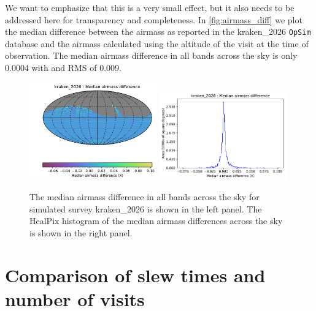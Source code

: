 \documentclass[DM,lsstdraft,authoryear,toc]{lsstdoc}
\newcommand{\opsim}{\texttt{OpSim}\xspace}
\begin{document}
We want to emphasize that this is a very small effect, but it also needs to be addressed here for transparency and
completeness.  In \autoref{fig:airmass_diff} we plot the median difference between the airmass as reported in the kraken\_2026
\opsim database and the airmass calculated using the altitude of the visit at the time of observation. The median airmass
difference in all bands across the sky is only 0.0004 with and RMS of 0.009.

\begin{figure}[ht]
\centering
\includegraphics[width=0.49\textwidth]{figures/kraken_2026_Median_airmass_difference_HEAL_SkyMap.pdf}
\includegraphics[width=0.49\textwidth]{figures/kraken_2026_Median_airmass_difference_HEAL_Histogram.pdf}
\caption{The median airmass difference  in all bands across the sky for simulated survey
kraken\_2026 is shown in the left panel. The HealPix histogram of the median airmass differences
across the sky is shown in the right panel.}
\label{fig:airmass_diff}
\end{figure}

\section{Comparison of slew times and number of visits}
\end{document}

